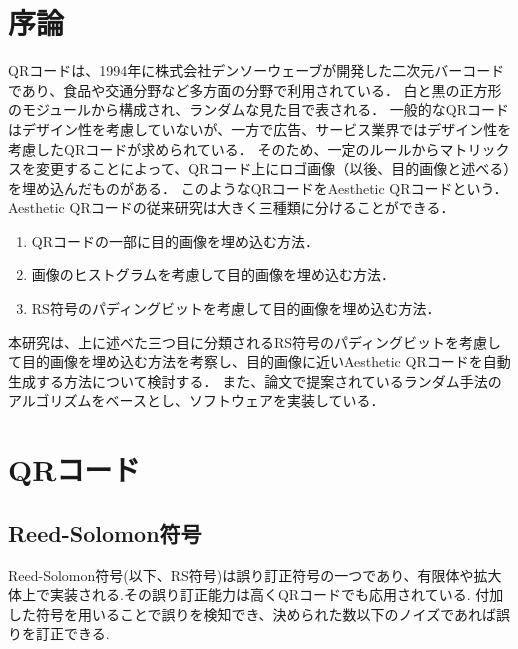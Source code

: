 \documentclass{thesis}
\begin{document}
\tableofcontents

\chapter{序論}

QRコード\cite{QR}は、1994年に株式会社デンソーウェーブが開発した二次元バーコード であり、食品や交通分野など多方面の分野で利用されている．
白と黒の正方形のモジュールから構成され、ランダムな見た目で表される．
一般的なQRコードはデザイン性を考慮していないが、一方で広告、サービス業界ではデザイン性を考慮したQRコードが求められている．
そのため、一定のルールからマトリックスを変更することによって、QRコード上にロゴ画像（以後、目的画像と述べる）を埋め込んだものがある．
このようなQRコードをAesthetic QRコード\cite{KURI}という．\\

Aesthetic QRコードの従来研究は大きく三種類に分けることができる．

\begin{enumerate}
\item
QRコードの一部に目的画像を埋め込む方法．
\item
画像のヒストグラムを考慮して目的画像を埋め込む方法．\cite{hist}
\item
RS符号のパディングビットを考慮して目的画像を埋め込む方法．\cite{KURI}
\end{enumerate}

本研究は、上に述べた三つ目に分類されるRS符号のパディングビットを考慮して目的画像を埋め込む方法を考察し、目的画像に近いAesthetic QRコードを自動生成する方法について検討する．
また、論文\cite{KURI}で提案されているランダム手法のアルゴリズムをベースとし、ソフトウェアを実装している．


\chapter{QRコード}


\section{Reed-Solomon符号}

Reed-Solomon符号(以下、RS符号)は誤り訂正符号の一つであり、有限体や拡大体上で実装される.その誤り訂正能力は高くQRコードでも応用されている.
付加した符号を用いることで誤りを検知でき、決められた数以下のノイズであれば誤りを訂正できる.
\end{document}
